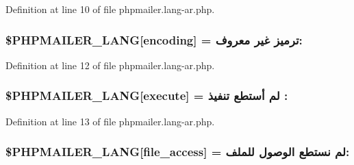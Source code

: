 Definition at line 10 of file phpmailer.\+lang-\/ar.\+php.

\subsubsection[{\texorpdfstring{\$\+P\+H\+P\+M\+A\+I\+L\+E\+R\+\_\+\+L\+A\+NG}{$PHPMAILER_LANG}}]{\setlength{\rightskip}{0pt plus 5cm}\$P\+H\+P\+M\+A\+I\+L\+E\+R\+\_\+\+L\+A\+NG\mbox{[}\textquotesingle{}encoding\textquotesingle{}\mbox{]} = \textquotesingle{}ترميز غير معروف\+: \textquotesingle{}}\hypertarget{phpmailer_8lang-ar_8php_a817f7283f3d54c970a0c10305cc668cc}{}\label{phpmailer_8lang-ar_8php_a817f7283f3d54c970a0c10305cc668cc}


Definition at line 12 of file phpmailer.\+lang-\/ar.\+php.

\subsubsection[{\texorpdfstring{\$\+P\+H\+P\+M\+A\+I\+L\+E\+R\+\_\+\+L\+A\+NG}{$PHPMAILER_LANG}}]{\setlength{\rightskip}{0pt plus 5cm}\$P\+H\+P\+M\+A\+I\+L\+E\+R\+\_\+\+L\+A\+NG\mbox{[}\textquotesingle{}execute\textquotesingle{}\mbox{]} = \textquotesingle{}لم أستطع تنفيذ \+: \textquotesingle{}}\hypertarget{phpmailer_8lang-ar_8php_a668217a9563a168f30f2a8548b6ed5a9}{}\label{phpmailer_8lang-ar_8php_a668217a9563a168f30f2a8548b6ed5a9}


Definition at line 13 of file phpmailer.\+lang-\/ar.\+php.

\subsubsection[{\texorpdfstring{\$\+P\+H\+P\+M\+A\+I\+L\+E\+R\+\_\+\+L\+A\+NG}{$PHPMAILER_LANG}}]{\setlength{\rightskip}{0pt plus 5cm}\$P\+H\+P\+M\+A\+I\+L\+E\+R\+\_\+\+L\+A\+NG\mbox{[}\textquotesingle{}file\+\_\+access\textquotesingle{}\mbox{]} = \textquotesingle{}لم نستطع الوصول للملف\+: \textquotesingle{}}\hypertarget{phpmailer_8lang-ar_8php_a7e83349023b856ef9e5c46e30ae6d51e}{}\label{phpmailer_8lang-ar_8php_a7e83349023b856ef9e5c46e30ae6d51e}



